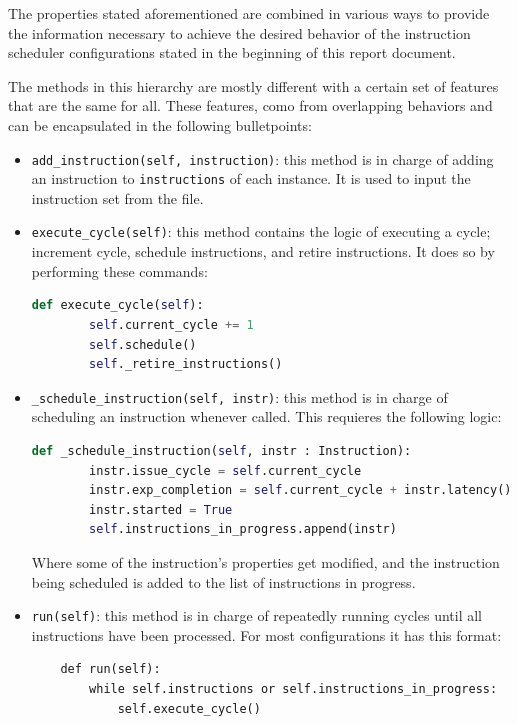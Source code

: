\documentclass{article}
\begin{document}
The properties stated aforementioned are combined in various ways to provide the information necessary to achieve the desired behavior of the instruction scheduler configurations stated in the beginning of this report document.

The methods in this hierarchy are mostly different with a certain set of features that are the same for all. These features, como from overlapping behaviors and can be encapsulated in the following bulletpoints:

\begin{itemize}
    \item \lstinline{add_instruction(self, instruction)}: this method is in charge of adding an instruction to \lstinline|instructions| of each instance. It is used to input the instruction set from the file.
    \item \lstinline{execute_cycle(self)}: this method contains the logic of executing a cycle; increment cycle, schedule instructions, and retire instructions. It does so by performing these commands:
    \begin{lstlisting}[language=Python]
    def execute_cycle(self):
        self.current_cycle += 1
        self.schedule()
        self._retire_instructions()
    \end{lstlisting}
    \item \lstinline|_schedule_instruction(self, instr)|: this method is in charge of scheduling an instruction whenever called. This requieres the following logic: 
    \begin{lstlisting}[language=Python]
    def _schedule_instruction(self, instr : Instruction):
        instr.issue_cycle = self.current_cycle
        instr.exp_completion = self.current_cycle + instr.latency()
        instr.started = True 
        self.instructions_in_progress.append(instr)
    \end{lstlisting}
    Where some of the instruction's properties get modified, and the instruction being scheduled is added to the list of instructions in progress. 
    \item \lstinline|run(self)|: this method is in charge of repeatedly running cycles until all instructions have been processed. For most configurations it has this format:
    \begin{lstlisting}
    def run(self):
        while self.instructions or self.instructions_in_progress:
            self.execute_cycle()
    \end{lstlisting}
\end{itemize}
\end{document}
